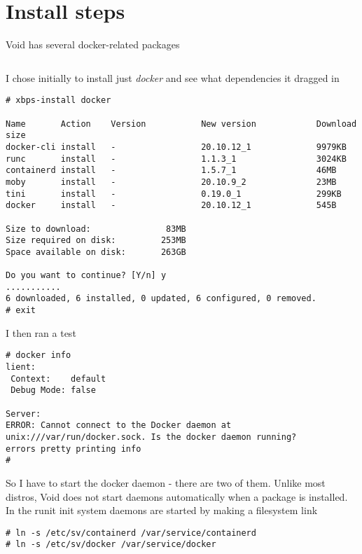 \documentclass{article}  %
\begin{document}
\section{Install steps}
\label{sec:install}
Void has several docker-related packages
\begin{verbatim}
\end{verbatim}
I chose initially to install just {\em docker} and see what dependencies it dragged in
\begin{verbatim}
# xbps-install docker

Name       Action    Version           New version            Download size
docker-cli install   -                 20.10.12_1             9979KB 
runc       install   -                 1.1.3_1                3024KB 
containerd install   -                 1.5.7_1                46MB 
moby       install   -                 20.10.9_2              23MB 
tini       install   -                 0.19.0_1               299KB 
docker     install   -                 20.10.12_1             545B 

Size to download:               83MB
Size required on disk:         253MB
Space available on disk:       263GB

Do you want to continue? [Y/n] y
...........
6 downloaded, 6 installed, 0 updated, 6 configured, 0 removed.
# exit

\end{verbatim}

I then ran a test
\begin{verbatim}
# docker info
lient:
 Context:    default
 Debug Mode: false

Server:
ERROR: Cannot connect to the Docker daemon at unix:///var/run/docker.sock. Is the docker daemon running?
errors pretty printing info
# 
\end{verbatim}

 So I have to start the docker daemon - there are two of them. Unlike most distros, Void does not start daemons automatically when a package is installed. In the runit init system daemons are started by making a filesystem link
\begin{verbatim}
# ln -s /etc/sv/containerd /var/service/containerd
# ln -s /etc/sv/docker /var/service/docker
\end{verbatim}
\end{document}
